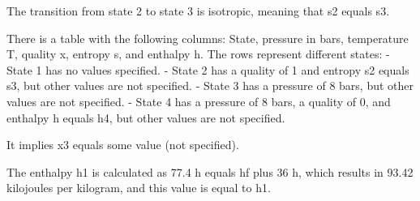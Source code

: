 The transition from state 2 to state 3 is isotropic, meaning that s2 equals s3.

There is a table with the following columns: State, pressure in bars, temperature T, quality x, entropy s, and enthalpy h. The rows represent different states:
- State 1 has no values specified.
- State 2 has a quality of 1 and entropy s2 equals s3, but other values are not specified.
- State 3 has a pressure of 8 bars, but other values are not specified.
- State 4 has a pressure of 8 bars, a quality of 0, and enthalpy h equals h4, but other values are not specified.

It implies x3 equals some value (not specified).

The enthalpy h1 is calculated as 77.4 h equals hf plus 36 h, which results in 93.42 kilojoules per kilogram, and this value is equal to h1.